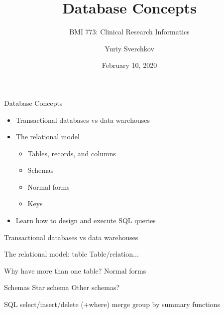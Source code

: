 \documentclass[aspectratio=169]{beamer}
\title{Database Concepts}
\subtitle{BMI 773: Clinical Research Informatics}
\author{Yuriy Sverchkov}
\institute{University of Wisconsin--Madison}
\date{February 10, 2020}
\begin{document}
	
	{
		\begin{frame}[plain]
			\vskip4cm
			\titlepage
		\end{frame}
	}

	\begin{frame}{Database Concepts}
		\begin{itemize}
			\item Transactional databases vs data warehouses
			\item The relational model
			\begin{itemize}
				\item Tables, records, and columns
				\item Schemas
				\item Normal forms
				\item Keys
			\end{itemize}
			\item Learn how to design and execute SQL queries
		\end{itemize}
	\end{frame}

	\begin{frame}{Transactional databases vs data warehouses}
	\end{frame}

	\begin{frame}{The relational model: table}
		Table/relation...
	\end{frame}

	\begin{frame}{Why have more than one table?}
		Normal forms
	\end{frame}

	\begin{frame}{Schemas}
		Star schema
		Other schemas?
	\end{frame}

	\begin{frame}{SQL}
		select/insert/delete (+where)
		merge
		group by
		summary functions
	\end{frame}
\end{document}
